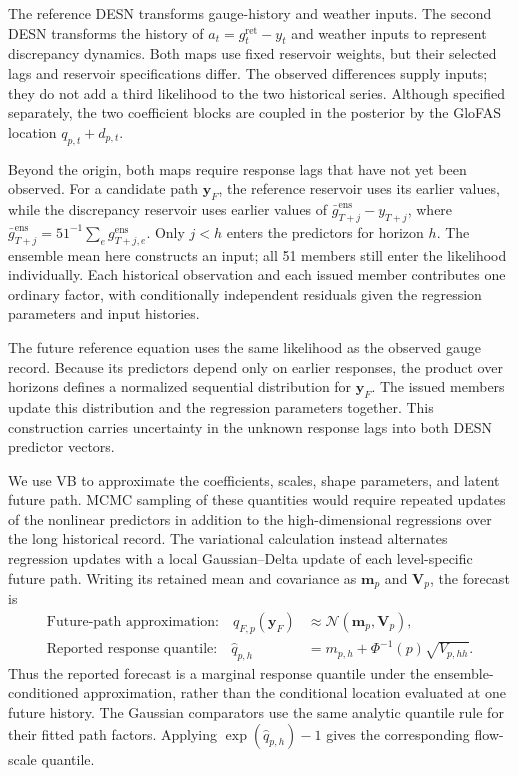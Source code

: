 \documentclass[12pt,letterpaper]{article}
\numberwithin{equation}{section}
\newcommand{\Normal}{\mathcal{N}}
\newcommand{\vect}[1]{\bm{#1}}
\newcommand{\mat}[1]{\bm{#1}}
\begin{document}
The reference DESN transforms gauge-history and weather inputs. The second
DESN transforms the history of
\(a_t=g_t^{\mathrm{ret}}-y_t\) and weather inputs to represent discrepancy
dynamics. Both maps use fixed reservoir weights, but their selected lags
and reservoir specifications differ. The observed differences supply inputs;
they do not add a third likelihood to the two historical series.
Although specified separately, the two coefficient blocks are coupled in
the posterior by the GloFAS location \(q_{p,t}+d_{p,t}\).

Beyond the origin, both maps require response lags that have not yet been
observed. For a candidate path \(\vect y_F\), the reference reservoir
uses its earlier values, while the discrepancy reservoir uses earlier
values of \(\bar g_{T+j}^{\mathrm{ens}}-y_{T+j}\), where
\(\bar g_{T+j}^{\mathrm{ens}}=51^{-1}\sum_e g_{T+j,e}^{\mathrm{ens}}\).
Only \(j<h\) enters the predictors for horizon \(h\). The ensemble mean
here constructs an input; all 51 members still enter the likelihood
individually. Each historical observation and each issued member contributes
one ordinary factor, with conditionally independent residuals given the
regression parameters and input histories.

The future reference equation uses the same likelihood as the observed
gauge record. Because its predictors depend only on earlier responses, the
product over horizons defines a normalized sequential distribution for
\(\vect y_F\). The issued members update this distribution and the
regression parameters together. This construction carries uncertainty in
the unknown response lags into both DESN predictor vectors.

We use VB to approximate the coefficients, scales, shape parameters, and
latent future path. MCMC sampling of these quantities would require repeated
updates of the nonlinear predictors in addition to the high-dimensional
regressions over the long historical record. The variational calculation
instead alternates regression updates with a local Gaussian--Delta update
of each level-specific future path. Writing its retained mean and covariance
as \(\vect m_p\) and \(\mat V_p\), the forecast is
\begin{equation}
\begin{aligned}
\text{Future-path approximation:}\quad
q_{F,p}(\vect y_F)&\approx\Normal(\vect m_p,\mat V_p),\\
\text{Reported response quantile:}\quad
\widehat q_{p,h}&=m_{p,h}+\Phi^{-1}(p)\sqrt{V_{p,hh}}.
\end{aligned}
\label{eq:glofas-reference-forecast-main}
\end{equation}
Thus the reported forecast is a marginal response quantile under the
ensemble-conditioned approximation, rather than the conditional location
evaluated at one future history. The Gaussian comparators use the same
analytic quantile rule for their fitted path factors. Applying
\(\exp(\widehat q_{p,h})-1\) gives the corresponding flow-scale quantile.
\end{document}
